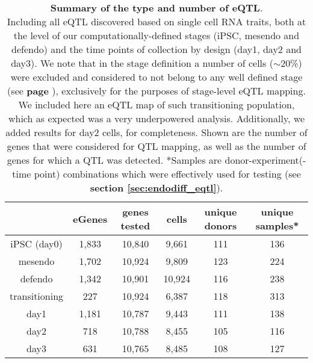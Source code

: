 \begin{table}[h]
    \centering
    \begin{tabular}{c | c c c c c}
     & eGenes & genes tested & cells & unique donors & unique samples*  \\
    \hline
    iPSC (day0) & 1,833 & 10,840 & 9,661 & 111 & 136 \\
    mesendo & 1,702 & 10,924 & 9,809 & 123 & 224 \\
    defendo & 1,342 & 10,901 & 10,924 & 116 & 238\\
    transitioning & 227 & 10,924 & 6,387 & 118 & 313 \\
    day1 & 1,181 & 10,787 & 9,443 & 111 & 138 \\
    day2 & 718 & 10,788 & 8,455 & 105 & 116 \\
    day3 & 631 & 10,765 & 8,485 & 108 & 127 \\
    \end{tabular}
    \caption[Summary of the type and number of eQTL]{\textbf{Summary of the type and number of eQTL}.\\
    Including all eQTL discovered based on single cell RNA traits, both at the level of our computationally-defined stages (iPSC, mesendo and defendo) and the time points of collection by design (day1, day2 and day3).
    We note that in the stage definition a number of cells ($\sim$20\%) were excluded and considered to not belong to any well defined stage (see \textbf{page \pageref{fig:endodiff_stages}}), exclusively for the purposes of stage-level eQTL mapping.
    We included here an eQTL map of such transitioning population, which as expected was a very underpowered analysis.
    Additionally, we added results for day2 cells, for completeness.
    Shown are the number of genes that were considered for QTL mapping, as well as the number of genes for which a QTL was detected.
    *Samples are donor-experiment(-time point) combinations which were effectively used for testing (see \textbf{section \ref{sec:endodiff_eqtl}}).}
    \label{tab:endodiff_eqtl_summary}
\end{table}

\vspace{10mm}

